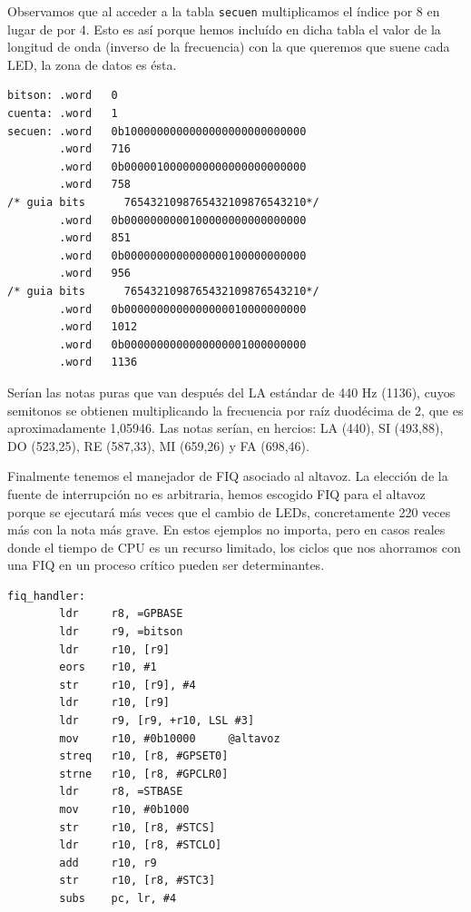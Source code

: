 Observamos que al acceder a la tabla {\tt secuen} multiplicamos el índice por 8 en lugar de
por 4. Esto es así porque hemos incluído en dicha tabla el valor de la longitud de onda (inverso
de la frecuencia) con la que queremos que suene cada LED, la zona de datos es ésta.

\begin{lstlisting}
bitson: .word   0
cuenta: .word   1
secuen: .word   0b1000000000000000000000000000
        .word   716
        .word   0b0000010000000000000000000000
        .word   758
/* guia bits      7654321098765432109876543210*/
        .word   0b0000000000100000000000000000
        .word   851
        .word   0b0000000000000000100000000000
        .word   956
/* guia bits      7654321098765432109876543210*/
        .word   0b0000000000000000010000000000
        .word   1012
        .word   0b0000000000000000001000000000
        .word   1136
\end{lstlisting}

Serían las notas puras que van después del LA estándar de 440 Hz (1136), cuyos semitonos se
obtienen multiplicando la frecuencia por raíz duodécima de 2, que es aproximadamente 1,05946.
Las notas serían, en hercios: LA (440), SI (493,88), DO (523,25), RE (587,33), MI (659,26) y
FA (698,46).

Finalmente tenemos el manejador de FIQ asociado al altavoz. La elección de la fuente de
interrupción no es arbitraria, hemos escogido FIQ para el altavoz porque se ejecutará más veces
que el cambio de LEDs, concretamente 220 veces más con la nota más grave. En estos ejemplos
no importa, pero en casos reales donde el tiempo de CPU es un recurso limitado, los ciclos
que nos ahorramos con una FIQ en un proceso crítico pueden ser determinantes.

\begin{lstlisting}
fiq_handler:
        ldr     r8, =GPBASE
        ldr     r9, =bitson
        ldr     r10, [r9]
        eors    r10, #1
        str     r10, [r9], #4
        ldr     r10, [r9]
        ldr     r9, [r9, +r10, LSL #3]
        mov     r10, #0b10000     @altavoz
        streq   r10, [r8, #GPSET0]
        strne   r10, [r8, #GPCLR0]
        ldr     r8, =STBASE
        mov     r10, #0b1000
        str     r10, [r8, #STCS]
        ldr     r10, [r8, #STCLO]
        add     r10, r9
        str     r10, [r8, #STC3]
        subs    pc, lr, #4
\end{lstlisting}

